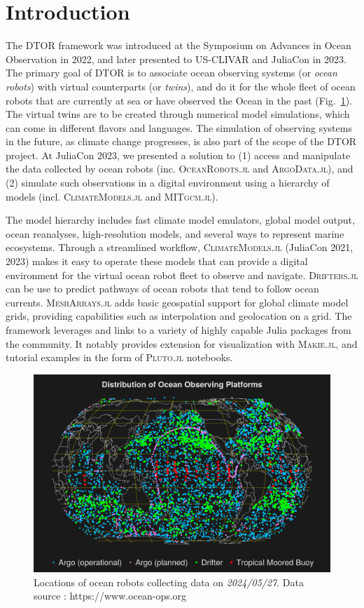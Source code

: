 \documentclass{juliacon}[12pt]
\newcommand{\pkg}[1]{{\small \textsc{#1}}}
\begin{document}
\section{Introduction}

The DTOR framework was introduced at the Symposium on Advances in Ocean Observation in 2022, and later presented to US-CLIVAR and JuliaCon in 2023. The primary goal of DTOR is to associate ocean observing systems (or {\it ocean robots}) with virtual counterparts (or {\it twins}), and do it for the whole fleet of ocean robots that are currently at sea or have observed the Ocean in the past (Fig.~\ref{fig:ocean-ops}). The virtual twins are to be created through numerical model simulations, which can come in different flavors and languages. The simulation of observing systems in the future, as climate change progresses, is also part of the scope of the DTOR project. At JuliaCon 2023, we presented a solution to (1) access and manipulate the data collected by ocean robots (inc. \pkg{OceanRobots.jl} and \pkg{ArgoData.jl}), and (2) simulate such observations in a digital environment using a hierarchy of models (incl. \pkg{ClimateModels.jl} and \pkg{MITgcm.jl}).

The model hierarchy includes fast climate model emulators, global model output, ocean reanalyses, high-resolution models, and several ways to represent marine ecosystems. Through a streamlined workflow, \pkg{ClimateModels.jl} (JuliaCon 2021, 2023) makes it easy to operate these models that can provide a digital environment for the virtual ocean robot fleet to observe and navigate. \pkg{Drifters.jl} \cite{Forget2021} can be use to predict pathways of ocean robots that tend to follow ocean currents. \pkg{MeshArrays.jl} adds basic geospatial support for global climate model grids, providing capabilities such as interpolation and geolocation on a grid. The framework leverages and links to a variety of highly capable Julia packages from the community. It notably provides extension for visualization with \pkg{Makie.jl}, and tutorial examples in the form of \pkg{Pluto.jl} notebooks.

\begin{figure}[t]
\centerline{\includegraphics[width=\columnwidth]{figs/20240528_OceanOPS.png}}
\caption{Locations of ocean robots collecting data on {\it 2024/05/27}. Data source : https://www.ocean-ops.org}
\label{fig:ocean-ops}
\end{figure}
\end{document}
